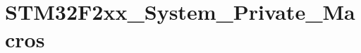 \hypertarget{group___s_t_m32_f2xx___system___private___macros}{\section{S\-T\-M32\-F2xx\-\_\-\-System\-\_\-\-Private\-\_\-\-Macros}
\label{group___s_t_m32_f2xx___system___private___macros}
}
